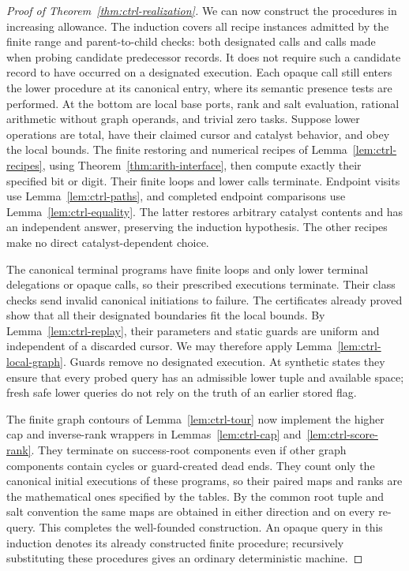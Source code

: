 \begin{proof}[Proof of Theorem~\ref{thm:ctrl-realization}]
We can now construct the procedures in increasing allowance.  The induction covers
all recipe instances admitted by the finite range and parent-to-child
checks: both designated calls and calls made when probing candidate
predecessor records.  It does not require such a candidate record to
have occurred on a designated execution.  Each opaque call still enters
the lower procedure at its canonical entry, where its semantic presence
tests are performed.  At the bottom are
local base ports, rank and salt evaluation, rational arithmetic without
graph operands, and trivial zero tasks.  Suppose lower operations are
total, have their claimed cursor and catalyst behavior, and obey the
local bounds.  The finite restoring and numerical recipes of
Lemma~\ref{lem:ctrl-recipes}, using
Theorem~\ref{thm:arith-interface}, then compute exactly their specified
bit or digit.  Their finite loops and lower calls terminate.  Endpoint
visits use Lemma~\ref{lem:ctrl-paths}, and completed endpoint comparisons
use Lemma~\ref{lem:ctrl-equality}.  The latter restores arbitrary
catalyst contents and has an independent answer, preserving the
induction hypothesis.  The other recipes make no direct
catalyst-dependent choice.

The canonical terminal programs have finite loops and only lower
terminal delegations or opaque calls, so their prescribed executions
terminate.  Their class checks send invalid canonical initiations to
failure.  The certificates already proved show that all their
designated boundaries fit the local bounds.  By
Lemma~\ref{lem:ctrl-replay}, their parameters and static guards are
uniform and independent of a discarded cursor.  We may therefore
apply Lemma~\ref{lem:ctrl-local-graph}.  Guards remove no designated
execution.  At synthetic states they ensure that every probed query
has an admissible lower tuple and available space; fresh safe lower
queries do not rely on the truth of an earlier stored flag.

The finite graph contours of Lemma~\ref{lem:ctrl-tour} now implement
the higher cap and inverse-rank wrappers in
Lemmas~\ref{lem:ctrl-cap} and~\ref{lem:ctrl-score-rank}.  They terminate
on success-root components even if other graph components contain
cycles or guard-created dead ends.  They count only the canonical
initial executions of these programs, so their paired maps and ranks
are the mathematical ones specified by the tables.  By the common root
tuple and salt convention the same maps are obtained in either
direction and on every re-query.  This completes the well-founded
construction.  An opaque query in this induction denotes its already
constructed finite procedure; recursively substituting these
procedures gives an ordinary deterministic machine.


\end{proof}
